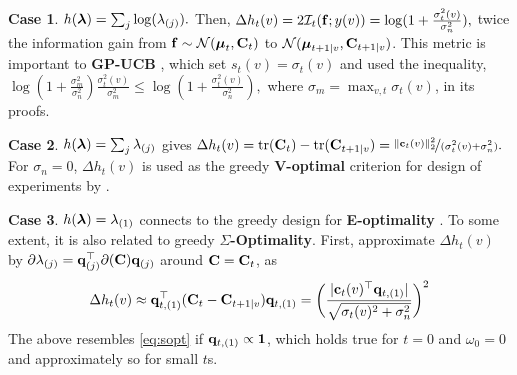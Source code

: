 \textbf{Case 1}. $
	h(\boldsymbol{\lambda}) = \sum_j \log(\lambda_{(j)}).$ 
	Then,
$	\Delta h_t(v) 
	= 2\mathcal{I}_t(\mathbf{f}; y(v)) = \log(1+\frac{\sigma_t^2(v)}{\sigma_n^2}),
$ twice the information gain from $\mathbf{f}\sim\mathcal{N}(\boldsymbol \mu_t, {\mathbf C}_t)$ to $\mathcal{N}(\boldsymbol \mu_{t+1\mid v}, {\mathbf C}_{t+1\mid v})$. 
This metric is important to \textbf{GP-UCB} \citep{srinivas2012information}, which set $s_t(v)=\sigma_t(v)$ and used the inequality, $\log(1+\frac{\sigma_m^2}{\sigma_n^2})  \frac{\sigma_t^2(v)}{\sigma_m^2}\leq\log(1+\frac{\sigma_t^2(v)}{\sigma_n^2}),$ where $\sigma_m=\max_{v,t}\sigma_t(v)$, in its proofs.




\textbf{Case 2}. $
	h(\boldsymbol{\lambda}) = \sum_j \lambda_{(j)} $ 
	gives
	$
	\Delta h_t(v) = \operatorname{tr}({\mathbf C}_{t}) - \operatorname{tr}({\mathbf C}_{t+1\mid v}) =  \nicefrac{ \| \mathbf{c}_t(v) \|_2^2 }{(\sigma_t^2(v) + \sigma_n^2)}.
$ For $\sigma_n= 0$, $\Delta h_t(v)$ is used as the greedy \textbf{V-optimal} criterion for design of experiments by \cite{mingji}.


\textbf{Case 3}. $
	h(\boldsymbol{\lambda}) = \lambda_{(1)}$ connects to the greedy design for \textbf{E-optimality} \citep{pukelsheim1993optimal}. To some extent, it is also related to greedy \textbf{$\Sigma$-Optimality}. First,
	approximate $\Delta h_t(v)$ by $\partial\lambda_{(j)} = \mathbf{q}_{(j)}^\top \partial({\mathbf C}) \mathbf{q}_{(j)}$ around ${\mathbf C}={\mathbf C}_t$, as
\vspace{-.5em}
\begin{equation*}
	\Delta h_t(v) 
	\approx 
	\mathbf{q}_{t,(1)}^\top ({\mathbf C}_t-{\mathbf C}_{t+1|v}) \mathbf{q}_{t,(1)}
	= 
	 \bigg( 
		\frac{|\mathbf{c}_t(v)^\top \mathbf{q}_{t,(1)}|}
	{\sqrt{\sigma_t(v)^2 + \sigma_n^2}}
	 \bigg)^2
	\end{equation*}
The above resembles \eqref{eq:sopt} if $\mathbf{q}_{t,(1)}\propto \mathbf 1$, which holds true for $t=0$ and $\omega_0=0$ and approximately so for small $t$s.




